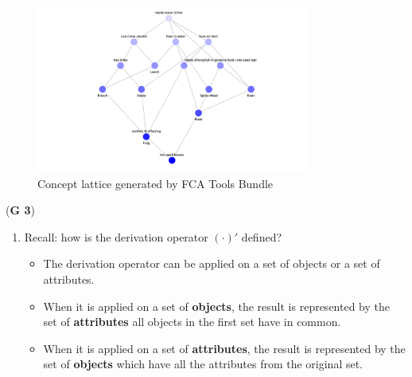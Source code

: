 \documentclass{article}
\begin{document}
\begin{enumerate}[label=\alph*)]
\begin{figure}[htbp]
\centering
\includegraphics[width=0.8\textwidth]{FCA_Tools_Bundle_ConceptLattice.png}
\caption{Concept lattice generated by FCA Tools Bundle}
\label{fig}
\end{figure}

\newpage

\left(\textbf{G 3}\right)

\begin{enumerate}[label=\alph*)]
  \item Recall: how is the derivation operator $(\cdot)'$ defined?
    \begin{itemize}
      \item The derivation operator can be applied on a set of objects or a set of attributes.
      \item When it is applied on a set of \textbf{objects}, the result is represented by the set of \textbf{attributes} all objects in the first set have in common.
      \item When it is applied on a set of \textbf{attributes}, the result is represented by the set of \textbf{objects} which have all the attributes from the original set.
    \end{itemize}


\end{enumerate}
\end{enumerate}
\end{document}
